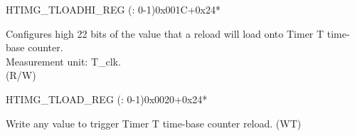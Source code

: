 \begin{register}{H}{TIMG\_TLOADHI\_REG (: 0-1)}{0x001C+0x24*}\label{regdesc:TIMGTXLOADHIREG}
%
%
\regnewline%
\begin{regdesc}\begin{reglist}
\label{fielddesc:TIMGTXLOADHI}\item [TIMG\_T\regindex{x}\_LOAD\_HI] Configures high 22 bits of the value that a reload will load onto Timer T time-base counter. \\
Measurement unit: T\_clk. \\
(R/W)
\end{reglist}\end{regdesc}
\end{register}


\begin{register}{H}{TIMG\_TLOAD\_REG (: 0-1)}{0x0020+0x24*}\label{regdesc:TIMGTXLOADREG}
%
\regnewline%
\begin{regdesc}\begin{reglist}
\label{fielddesc:TIMGTXLOAD}\item [TIMG\_T\regindex{x}\_LOAD]
Write any value to trigger Timer T time-base counter reload. (WT)
\end{reglist}\end{regdesc}
\end{register}


